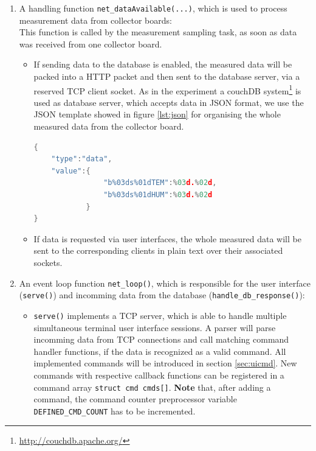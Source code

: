 \documentclass[a4paper]{scrreprt}
\begin{document}
\begin{enumerate}
  \item A handling function \texttt{net\_dataAvailable(...)}, which is used to process measurement data from collector boards:\\
    This function is called by the measurement sampling task, as soon as data was received from one collector board.
    \begin{itemize}
    \item If sending data to the database is enabled,
    the measured data will be packed into a HTTP packet and then sent to the database
    server, via a reserved TCP client socket.
    As in the experiment a couchDB system\footnote{\url{http://couchdb.apache.org/}} is used as database server,
    which accepts data in JSON format, we use the JSON template showed in figure \ref{lst:json} for organising the whole measured data from the collector board. 
\lstset{style=mathstyle}
\begin{lstlisting}[language=c,xleftmargin=70pt, xrightmargin=70pt,framexleftmargin=10pt,framextopmargin=10pt, framexbottommargin=10pt, caption={JSON template for sending data to the couchDB data base},label={lst:json}]
{
    "type":"data",
    "value":{
                "b%03ds%01dTEM":%03d.%02d,
                "b%03ds%01dHUM":%03d.%02d
            }
}
\end{lstlisting}
    \item If data is requested via user interfaces, the whole measured data will be sent to the corresponding clients in plain text over their associated sockets.
\end{itemize}
  \item An event loop function \texttt{net\_loop()}, which is responsible for the user interface (\texttt{serve()}) and incomming data from the database (\texttt{handle\_db\_response()}):
      \begin{itemize}
          \item \texttt{serve()} implements a TCP server, which is able to handle multiple simultaneous terminal user interface sessions.
A parser will parse incomming data from TCP connections and call matching command handler functions, if the data is recognized as a valid command.
All implemented commands will be introduced in section \ref{sec:uicmd}.
New commands with respective callback functions can be registered in a command array \texttt{struct cmd cmds[]}. \textbf{Note} that, after adding a command, the command counter preprocessor variable \texttt{DEFINED\_CMD\_COUNT} has to be incremented.\\

\end{itemize}
\end{enumerate}
\end{document}
